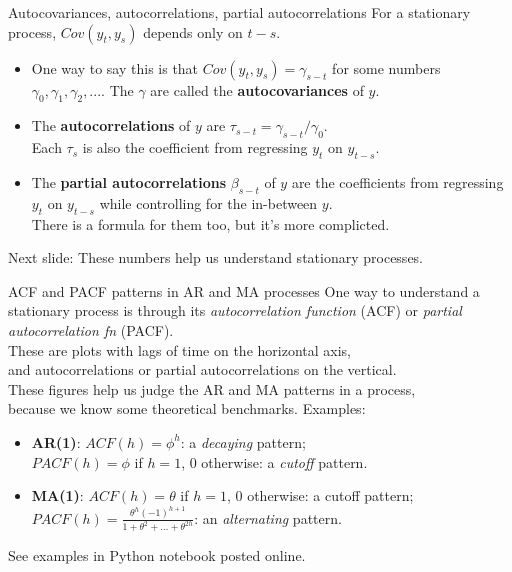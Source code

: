 \documentclass[t,12pt]{beamer}
\begin{document}
\begin{frame}[c]{Autocovariances, autocorrelations, partial autocorrelations}
For a stationary process, $Cov(y_t,y_s)$ depends only on $t-s$.
\begin{itemize}
\bigskip
\item
One way to say this is that $Cov(y_t,y_s) = \gamma_{s-t}$ for some numbers $\gamma_0,\gamma_1,\gamma_2,...$.
The $\gamma$ are called the \textbf{autocovariances} of $y$.
\medskip
\item The \textbf{autocorrelations} of $y$ are $\tau_{s-t} = \gamma_{s-t} / \gamma_0$.
\\
Each $\tau_s$ is also the coefficient from regressing $y_t$ on $y_{t-s}$.
\medskip
\item The \textbf{partial autocorrelations} $\beta_{s-t}$ of $y$ are the coefficients from regressing $y_t$ on $y_{t-s}$ while controlling for the in-between $y$.
\\ There is a formula for them too, but it's more complicted.
\end{itemize}
\bigskip
Next slide: These numbers help us understand stationary processes.
\end{frame}

\begin{frame}[c]{ACF and PACF patterns in AR and MA processes}
One way to understand a stationary process is through its \emph{autocorrelation function} (ACF) or \emph{partial autocorrelation fn} (PACF).
\\ \medskip
These are plots with lags of time on the horizontal axis, 
\\ and autocorrelations or partial autocorrelations on the vertical.
\\ \medskip
These figures help us judge the AR and MA patterns in a process, 
\\ because we know some theoretical benchmarks.
Examples:
\begin{itemize}
\smallskip
\item \textbf{AR(1)}: $ACF(h) = \phi^h$: a \emph{decaying} pattern; 
\\ $PACF(h) = \phi$ if $h=1$, 0 otherwise: a \emph{cutoff} pattern.
\smallskip
\item \textbf{MA(1)}: $ACF(h) = \theta$ if $h=1$, 0 otherwise: a cutoff pattern;
\\ $PACF(h) = \frac{\theta^h(-1)^{h+1}}{1+\theta^2+\dots+\theta^{2h}}$: an \emph{alternating} pattern.
\end{itemize}
\smallskip
See examples in Python notebook posted online.
\end{frame}
\end{document}

